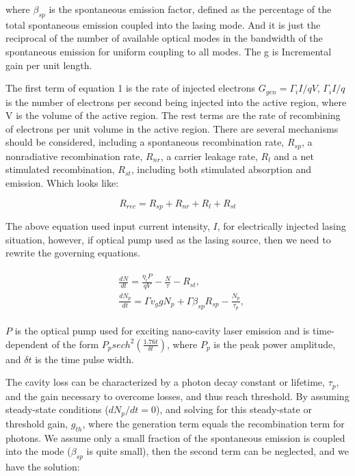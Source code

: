 where $\beta_{sp}$ is the spontaneous emission factor, defined as the
percentage of the total spontaneous emission coupled into the lasing mode. And it is
just the reciprocal of the number of available optical modes in the bandwidth of
the spontaneous emission for uniform coupling to all modes. The g is Incremental gain
per unit length.

The first term of equation 1 is the rate of injected electrons $G_{gen} =
{\Gamma_{i}I}/{qV}$, ${\Gamma_{i}I}/{q}$ is the number of electrons per
second being injected into the active region, where V is the volume of the
active region. The rest terms are the rate of recombining of electrons per unit
volume in the active region. There are several mechanisms should be considered,
including a spontaneous recombination rate, $R_{sp}$, a nonradiative
recombination rate, $R_{nr}$, a carrier leakage rate, $R_l$ and a net
stimulated recombination, $R_{st}$, including both stimulated absorption and
emission. Which looks like:

\begin{equation}
  R_{rec} = R_{sp} + R_{nr} + R_{l} + R_{st}
\end{equation}

The above equation used input current intensity, $I$, for electrically injected
lasing situation, however, if optical pump used as the lasing source, then we
need to rewrite the governing equations.

\begin{eqnarray}
\begin{aligned}
  & \frac{dN}{dt} = \frac{\eta_{i}P}{qV} - \frac{N}{\tau} - R_{st},
  \\
  & \frac{dN_p}{dt} = {\Gamma}v_g{g}N_p + \Gamma\beta_{sp}R_{sp} - \frac{N_p}{\tau_p},
\end{aligned}
\label{eq:eight}
\end{eqnarray}

$P$ is the optical pump used for exciting nano-cavity laser emission and is
time-dependent of the form $P_{p}sech^2(\frac{1.76t}{\delta{t}})$, where $P_p$ is the peak power amplitude, and $\delta{t}$ is the time pulse width.


The cavity loss can be characterized by a photon decay constant or lifetime,
$\tau_p$, and the gain necessary to overcome losses, and thus reach threshold.
By assuming steady-state conditions (\ie $dN_p/dt = 0$), and solving for this
steady-state or threshold gain, $g_{th}$, where the generation term equals the
recombination term for photons. We assume only a small fraction of the
spontaneous emission is coupled into the mode (\ie $\beta_{sp}$ is quite
small), then the second term can be neglected, and we have the solution:

